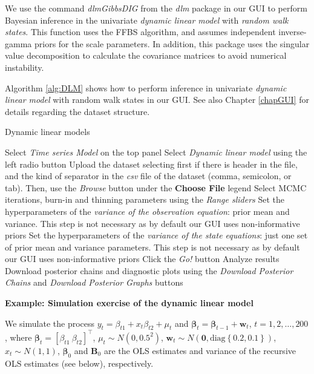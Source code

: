 We use the command \textit{dlmGibbsDIG} from the \textit{dlm} package in our GUI to perform Bayesian inference in the univariate \textit{dynamic linear model} with \textit{random walk states}. This function uses the FFBS algorithm, and assumes independent inverse-gamma priors for the scale parameters. In addition, this package uses the singular value decomposition to calculate the covariance matrices to avoid numerical instability.

Algorithm \ref{alg:DLM} shows how to perform inference in univariate \textit{dynamic linear model} with random walk states in our GUI. See also Chapter \ref{chapGUI} for details regarding the dataset structure.

\begin{algorithm}[h!]
	\caption{Dynamic linear models}\label{alg:DLM}
	\begin{algorithmic}[1]  		 			
		\State Select \textit{Time series Model} on the top panel
		\State Select \textit{Dynamic linear model} using the left radio button
		\State Upload the dataset selecting first if there is header in the file, and the kind of separator in the \textit{csv} file of the dataset (comma, semicolon, or tab). Then, use the \textit{Browse} button under the \textbf{Choose File} legend
		\State Select MCMC iterations, burn-in and thinning parameters using the \textit{Range sliders}
		\State Set the hyperparameters of the \textit{variance of the observation equation}: prior mean and variance. This step is not necessary as by default our GUI uses non-informative priors
		\State Set the hyperparameters of the \textit{variance of the state equations}: just one set of prior mean and variance parameters. This step is not necessary as by default our GUI uses non-informative priors
		\State Click the \textit{Go!} button
		\State Analyze results
		\State Download posterior chains and diagnostic plots using the \textit{Download Posterior Chains} and \textit{Download Posterior Graphs} buttons
	\end{algorithmic} 
\end{algorithm}

\textbf{Example: Simulation exercise of the dynamic linear model}

We simulate the process $y_t=\beta_{t1}+{x}_t{\beta}_{t2}+\mu_t$ and $\bm{\beta}_t=\bm{\beta}_{t-1}+\bm{w}_t$, $t=1,2,\dots,200$, where $\bm{\beta}_t=[\beta_{t1} \ {\beta}_{t2}]^{\top}$, $\mu_t\sim N(0,0.5^2)$, $\bm{w}_t\sim N(\bm{0},\text{diag}\left\{0.2,0.1\right\})$, $x_t\sim N(1, 1)$, $\bm{\beta}_0$ and $\bm{B}_0$ are the OLS estimates and variance of the recursive OLS estimates (see below), respectively.

